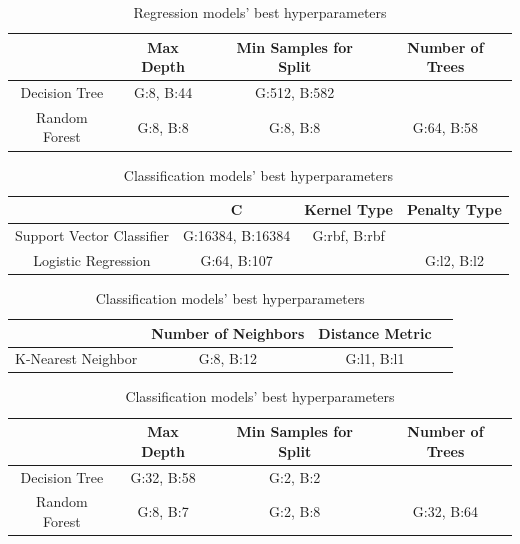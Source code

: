 \documentclass[12pt, letterpaper]{article}
\begin{document}
\begin{table}[H]
\centering
\caption{Regression models' best hyperparameters}
\label{reg_table}
\begin{tabular}{c|c|c|c} %
                & Max Depth     & Min Samples for Split & Number of Trees \\ \hline
Decision Tree   & G:8, B:44            & G:512, B:582                  &   \\
Random Forest   & G:8, B:8             & G:8, B:8                    & G:64, B:58 \\
\end{tabular}
\end{table}

\begin{table}[H]
\centering
\caption{Classification models' best hyperparameters}
\label{cls_table 1}
\begin{tabular}{c|c|c|c} %
                            & C         & Kernel Type   & Penalty Type \\ \hline
Support Vector Classifier   & G:16384, B:16384     & G:rbf, B:rbf \\
Logistic Regression         & G:64, B:107        &               & G:l2, B:l2 \\
\end{tabular}
\end{table}

\begin{table}[H]
\centering
\caption{Classification models' best hyperparameters}
\label{cls_table 2}
\begin{tabular}{c|c|c|c} %
                & Number of Neighbors & Distance Metric\\ \hline
K-Nearest Neighbor & G:8, B:12 & G:l1, B:l1 \\
\end{tabular}
\end{table}

\begin{table}[H]
\centering
\caption{Classification models' best hyperparameters}
\label{cls_table 3}
\begin{tabular}{c|c|c|c} %
                & Max Depth     & Min Samples for Split     & Number of Trees \\ \hline
Decision Tree   & G:32, B:58 & G:2, B:2 \\
Random Forest   & G:8, B:7 & G:2, B:8 & G:32, B:64 \\
\end{tabular}
\end{table}
\end{document}
